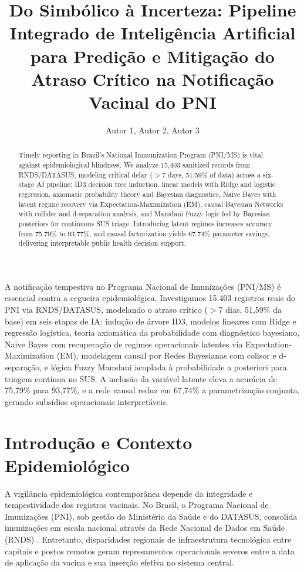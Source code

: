 \documentclass[12pt]{article}
\title{Do Simbólico à Incerteza: Pipeline Integrado de Inteligência Artificial para Predição e Mitigação do Atraso Crítico na Notificação Vacinal do PNI}
\author{Autor 1\inst{1}, Autor 2\inst{1}, Autor 3\inst{1}}
\begin{document}
\maketitle

\begin{resumo}
A notificação tempestiva no Programa Nacional de Imunizações (PNI/MS) é essencial contra a cegueira epidemiológica. Investigamos 15.403 registros reais do PNI via RNDS/DATASUS, modelando o atraso crítico ($>7$ dias, 51,59\% da base) em seis etapas de IA: indução de árvore ID3, modelos lineares com Ridge e regressão logística, teoria axiomática da probabilidade com diagnóstico bayesiano, Naive Bayes com recuperação de regimes operacionais latentes via Expectation-Maximization (EM), modelagem causal por Redes Bayesianas com colisor e d-separação, e lógica Fuzzy Mamdani acoplada à probabilidade a posteriori para triagem contínua no SUS. A inclusão da variável latente eleva a acurácia de 75,79\% para 93,77\%, e a rede causal reduz em 67,74\% a parametrização conjunta, gerando subsídios operacionais interpretáveis.
\end{resumo}

\begin{abstract}
Timely reporting in Brazil's National Immunization Program (PNI/MS) is vital against epidemiological blindness. We analyze 15,403 sanitized records from RNDS/DATASUS, modeling critical delay ($>7$ days, 51.59\% of data) across a six-stage AI pipeline: ID3 decision tree induction, linear models with Ridge and logistic regression, axiomatic probability theory and Bayesian diagnostics, Naive Bayes with latent regime recovery via Expectation-Maximization (EM), causal Bayesian Networks with collider and d-separation analysis, and Mamdani Fuzzy logic fed by Bayesian posteriors for continuous SUS triage. Introducing latent regimes increases accuracy from 75.79\% to 93.77\%, and causal factorization yields 67.74\% parameter savings, delivering interpretable public health decision support.
\end{abstract}

\section{Introdução e Contexto Epidemiológico}

A vigilância epidemiológica contemporânea depende da integridade e tempestividade dos registros vacinais. No Brasil, o Programa Nacional de Imunizações (PNI), sob gestão do Ministério da Saúde e do DATASUS, consolida imunizações em escala nacional através da Rede Nacional de Dados em Saúde (RNDS) \cite{brasil2023pni}. Entretanto, disparidades regionais de infraestrutura tecnológica entre capitais e postos remotos geram represamentos operacionais severos entre a data de aplicação da vacina e sua inserção efetiva no sistema central.
\end{document}

